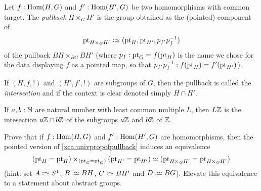\begin{definition}
  \label{def:intersectionofgroups}
  Let $f:\Hom(H,G)$ and $f':\Hom(H',G)$ be two homomorphisms with common target.  The \emph{pullback} $H\times_GH'$ is the group obtained as the (pointed) component of 
$$\pt_{H\times_GH'}\defequi(\pt_H,\pt_{H'},p_{f'}p_f^{-1})$$ of the pullback $BH\times_{BG}BH'$ (where $p_f:\mathrm{pt}_G=f(\mathrm{pt}_H)$ is the name we chose for the data displaying $f$ as a pointed map, so that $p_{f'}p_f^{-1}:f(\mathrm{pt}_H)=f'(\mathrm{pt}_{H'})$).

If $(H,f,!)$ and $(H',f',!)$ are subgroups of $G$, then the pullback is called the \emph{intersection} and if the context is clear denoted simply $H\cap H'$.
\end{definition}
\begin{example}
  If $a,b:\mathbb{N}$ are natural number with least common multiple $L$, then $L\mathbb{Z}$ is the intesection $a\mathbb{Z}\cap b\mathbb{Z}$ of the subgroups $a\mathbb{Z}$ and $b\mathbb{Z}$ of $\mathbb{Z}$. 
\end{example}

\begin{xca}
  Prove that if $f:\Hom(H,G)$ and $f':\Hom(H',G)$ are homomorphisms, then the pointed version of \cref{xca:univpropofpullback} induces an equivalence
$$(\mathrm{pt}_{H}=\mathrm{pt}_{H})\times_{(\mathrm{pt}_{G}=\mathrm{pt}_{G})}(\mathrm{pt}_{H'}=\mathrm{pt}_{H'})
\simeq (\mathrm{pt}_{H\times_GH'}=\mathrm{pt}_{H\times_GH'})
$$
(hint: set $A\defequi S^1$, $B\defequi BH$, $C\defequi BH'$ and $D\defequi BG$).  Elevate this equivalence to a statement about abstract groups.
\end{xca}

